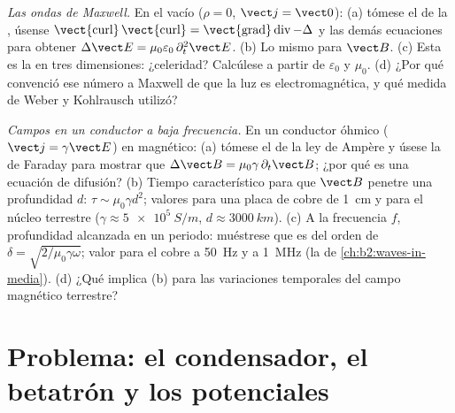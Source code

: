 \begin{exercise}[$\star\star\star$]\label{exo:b2:maxwell-equations:11}
\emph{Las ondas de Maxwell.} En el vacío ($\rho = 0$, $\vect j = \vect 0$): (a) tómese
el  de la , úsense $\operatorname{\vect{curl}}
\operatorname{\vect{curl}} = \operatorname{\vect{grad}}\operatorname{div} - \Delta$ y las demás
ecuaciones para obtener $\Delta\vect E = \mu_0\varepsilon_0\,\partial_t^2\vect E$. (b) Lo mismo para
$\vect B$. (c) Esta es la  en tres dimensiones: ¿celeridad?
Calcúlese a partir de $\varepsilon_0$ y $\mu_0$. (d) ¿Por qué convenció ese número
a Maxwell de que la luz es electromagnética, y qué medida de Weber y
Kohlrausch utilizó?
\end{exercise}

\begin{exercise}[$\star\star\star$]\label{exo:b2:maxwell-equations:12}
\emph{Campos en un conductor a baja frecuencia.} En un conductor óhmico
($\vect j = \gamma\vect E$) en  magnético: (a) tómese
el  de la ley de Ampère y úsese la de Faraday para mostrar que $\Delta\vect B = \mu_0\gamma\,
\partial_t\vect B$; ¿por qué es una ecuación de difusión? (b) Tiempo característico
para que $\vect B$ penetre una profundidad $d$: $\tau \sim \mu_0\gamma d^2$; valores para una
placa de cobre de \qty{1}{cm} y para el núcleo terrestre ($\gamma \approx \qty{5e5}{S/m}$,
$d \approx \qty{3000}{km}$). (c) A la frecuencia $f$, profundidad alcanzada en un
periodo: muéstrese que es del orden de $\delta = \sqrt{2/\mu_0\gamma\omega}$; valor para el cobre
a \qty{50}{Hz} y a \qty{1}{MHz} (la  de
\cref{ch:b2:waves-in-media}). (d) ¿Qué implica (b) para las variaciones
temporales del campo magnético terrestre?
\end{exercise}

\section{Problema: el condensador, el betatrón y los potenciales}

